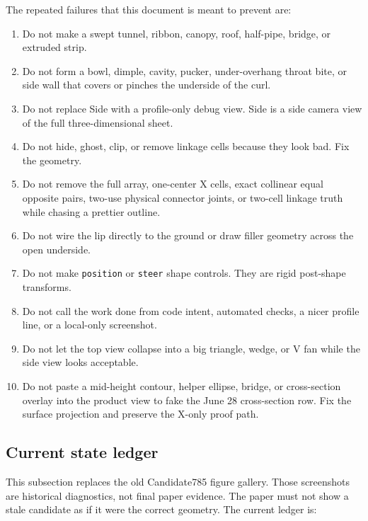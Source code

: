 \documentclass[12pt,letterpaper]{article}
\newcommand{\code}[1]{\texttt{#1}}
\begin{document}
The repeated failures that this document is meant to prevent are:
\begin{enumerate}
  \item Do not make a swept tunnel, ribbon, canopy, roof, half-pipe, bridge, or extruded strip.
  \item Do not form a bowl, dimple, cavity, pucker, under-overhang throat bite, or side wall that covers or pinches the underside of the curl.
  \item Do not replace Side with a profile-only debug view. Side is a side camera view of the full three-dimensional sheet.
  \item Do not hide, ghost, clip, or remove linkage cells because they look bad. Fix the geometry.
  \item Do not remove the full array, one-center X cells, exact collinear equal opposite pairs, two-use physical connector joints, or two-cell linkage truth while chasing a prettier outline.
  \item Do not wire the lip directly to the ground or draw filler geometry across the open underside.
  \item Do not make \code{position} or \code{steer} shape controls. They are rigid post-shape transforms.
  \item Do not call the work done from code intent, automated checks, a nicer profile line, or a local-only screenshot.
  \item Do not let the top view collapse into a big triangle, wedge, or V fan while the side view looks acceptable.
  \item Do not paste a mid-height contour, helper ellipse, bridge, or cross-section overlay into the product view to fake the June 28 cross-section row. Fix the surface projection and preserve the X-only proof path.
\end{enumerate}

\subsection{Current state ledger}

This subsection replaces the old Candidate785 figure gallery. Those screenshots are historical diagnostics, not final paper evidence. The paper must not show a stale candidate as if it were the correct geometry. The current ledger is:
\end{document}
